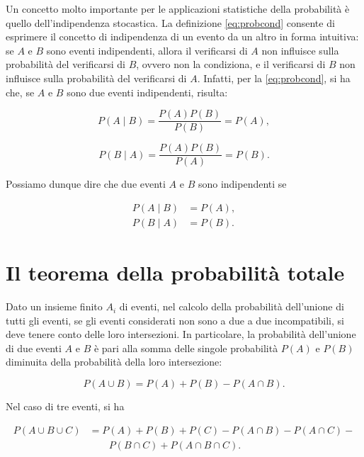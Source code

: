 \documentclass[
  11pt,
]{krantz}
\theoremstyle{definition}
\theoremstyle{definition}
\theoremstyle{definition}
\theoremstyle{definition}
\theoremstyle{remark}
\begin{document}
Un concetto molto importante per le applicazioni statistiche della probabilità è quello dell'indipendenza stocastica. La definizione \eqref{eq:probcond} consente di esprimere il concetto di indipendenza di un evento da un altro in forma intuitiva: se \(A\) e \(B\) sono eventi indipendenti, allora il verificarsi di \(A\) non influisce sulla probabilità del verificarsi di \(B\), ovvero non la condiziona, e il verificarsi di \(B\) non influisce sulla probabilità del verificarsi di \(A\). Infatti, per la \eqref{eq:probcond}, si ha che, se \(A\) e \(B\) sono due eventi indipendenti, risulta:

\[
P(A \mid B) = \frac{P(A)P(B)}{P(B)} = P(A),
\]

\[
P(B \mid A) = \frac{P(A)P(B)}{P(A)} = P(B).
\]

Possiamo dunque dire che due eventi \(A\) e \(B\) sono indipendenti se

\begin{equation}
\begin{split}
P(A \mid B) &= P(A), \\
P(B \mid A) &= P(B).
\end{split}
\end{equation}

\hypertarget{il-teorema-della-probabilituxe0-totale}{%
\section{Il teorema della probabilità totale}\label{il-teorema-della-probabilituxe0-totale}}

Dato un insieme finito \(A_i\) di eventi, nel calcolo della probabilità dell'unione di tutti gli eventi, se gli eventi considerati non sono a due a due incompatibili, si deve tenere conto delle loro intersezioni. In particolare, la probabilità dell'unione di due eventi \(A\) e \(B\) è pari alla somma delle singole probabilità \(P(A)\) e \(P(B)\) diminuita della probabilità della loro intersezione:

\begin{equation}
P(A \cup B) = P(A) + P(B) - P(A \cap B).
\label{eq:probunione}
\end{equation}

Nel caso di tre eventi, si ha

\[
\begin{split}
P(A \cup B \cup C) &= P(A)+P(B)+P(C)-P(A\cap B)-P(A\cap C) - \\
& \qquad P(B\cap C) + P(A\cap B\cap C).
\end{split}
\]
\end{document}
